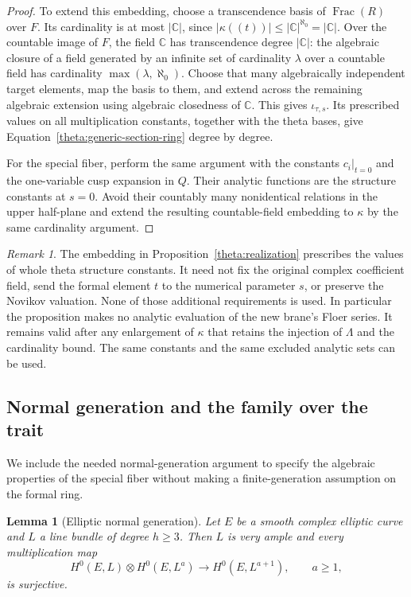 \documentclass[11pt]{article}
\newtheorem{lemma}[theorem]{Lemma}
\theoremstyle{definition}
\theoremstyle{remark}
\newtheorem{remark}[theorem]{Remark}
\numberwithin{equation}{section}
\begin{document}
\begin{proof}
To extend this embedding, choose a transcendence basis of
$\operatorname{Frac}(R)$ over $F$.  Its cardinality is at most
$|\mathbb C|$, since
$|\kappa((t))|\leq|\mathbb C|^{\aleph_0}=|\mathbb C|$.
Over the countable image of $F$, the field $\mathbb C$ has transcendence degree
$|\mathbb C|$: the algebraic closure of a field generated by an infinite set of
cardinality $\lambda$ over a countable field has cardinality
$\max(\lambda,\aleph_0)$.  Choose that many algebraically independent
target elements, map the basis to them, and extend across the remaining
algebraic extension using algebraic closedness of $\mathbb C$.  This gives
$\iota_{\tau,s}$.  Its prescribed values on all multiplication constants,
together with the theta bases, give
Equation~\eqref{theta:generic-section-ring} degree by degree.

For the special fiber, perform the same argument with the constants
$c_i|_{t=0}$ and the one-variable cusp expansion in $Q$.
Their analytic functions are the structure constants at $s=0$.
Avoid their countably many nonidentical relations in the upper half-plane
and extend the resulting countable-field embedding to $\kappa$ by the
same cardinality argument.
\end{proof}

\begin{remark}\label{theta:abstract-embedding}
The embedding in Proposition~\ref{theta:realization} prescribes the values
of whole theta structure constants.  It need not fix the original complex
coefficient field, send the formal element $t$ to the numerical parameter
$s$, or preserve the Novikov valuation.  None of those additional
requirements is used.  In particular the proposition makes no analytic
evaluation of the new brane's Floer series.  It remains valid after any
enlargement of $\kappa$ that retains the injection of $\Lambda$ and the
cardinality bound.  The same constants and the same excluded analytic
sets can be used.
\end{remark}

\subsection{Normal generation and the family over the trait}

We include the needed normal-generation argument to specify the algebraic
properties of the special fiber without making a finite-generation
assumption on the formal ring.

\begin{lemma}[Elliptic normal generation]\label{theta:elliptic-generation}
Let $E$ be a smooth complex elliptic curve and $L$ a line bundle of degree
$h\geq3$.  Then $L$ is very ample and every multiplication map
\[
 H^0(E,L)\otimes H^0(E,L^a)\longrightarrow H^0(E,L^{a+1}),
 \qquad a\geq1,
\]
is surjective.
\end{lemma}
\end{document}
